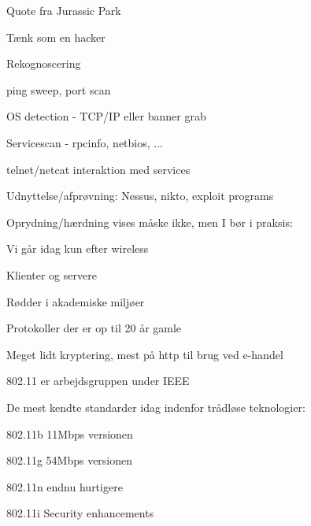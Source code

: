 \documentclass[20pt,landscape,a4paper,footrule]{foils}
\begin{document}
Quote fra Jurassic Park


\begin{list1}
\item Tænk som en hacker
\item Rekognoscering
\begin{list2}
\item ping sweep, port scan
\item OS detection - TCP/IP eller banner grab
\item Servicescan - rpcinfo, netbios, ...
\item telnet/netcat interaktion med services
\end{list2}
\item Udnyttelse/afprøvning: Nessus, nikto, exploit programs
\item Oprydning/hærdning vises måske ikke, men I bør i praksis:
\end{list1}

\vskip 1cm
\centerline{\hlkbig Vi går idag kun efter wireless}



\begin{list1}
\item Klienter og servere
\item Rødder i akademiske miljøer
\item Protokoller der er op til 20 år gamle
\item Meget lidt kryptering, mest på http til brug ved e-handel
\end{list1}




\begin{list1}
\item 802.11 er arbejdsgruppen under IEEE
\item De mest kendte standarder idag indenfor trådløse teknologier:
\begin{list2}
\item 802.11b 11Mbps versionen
\item 802.11g 54Mbps versionen
\item 802.11n endnu hurtigere
\item 802.11i Security enhancements
\end{list2}
\end{list1}
\end{document}
